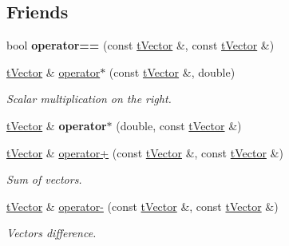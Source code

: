 \subsection*{Friends}
\begin{DoxyCompactItemize}
\item 
\mbox{\label{classtVector_ac2deba186e1ddd047a218201d4cf1c6f}} 
bool {\bfseries operator==} (const \hyperlink{classtVector}{t\+Vector} \&, const \hyperlink{classtVector}{t\+Vector} \&)
\item 
\mbox{\label{classtVector_ade0381c9b2e5496022391703599e1cfe}} 
\hyperlink{classtVector}{t\+Vector} \& \hyperlink{classtVector_ade0381c9b2e5496022391703599e1cfe}{operator$\ast$} (const \hyperlink{classtVector}{t\+Vector} \&, double)
\begin{DoxyCompactList}\small\item\em Scalar multiplication on the right. \end{DoxyCompactList}\item 
\mbox{\label{classtVector_a64a031b3695b984a50c362f8127f5bea}} 
\hyperlink{classtVector}{t\+Vector} \& {\bfseries operator$\ast$} (double, const \hyperlink{classtVector}{t\+Vector} \&)
\item 
\mbox{\label{classtVector_a9915bc8041ae050a433e85aea90f5471}} 
\hyperlink{classtVector}{t\+Vector} \& \hyperlink{classtVector_a9915bc8041ae050a433e85aea90f5471}{operator+} (const \hyperlink{classtVector}{t\+Vector} \&, const \hyperlink{classtVector}{t\+Vector} \&)
\begin{DoxyCompactList}\small\item\em Sum of vectors. \end{DoxyCompactList}\item 
\mbox{\label{classtVector_ab805cb8e1108272d31808bf4d258ba15}} 
\hyperlink{classtVector}{t\+Vector} \& \hyperlink{classtVector_ab805cb8e1108272d31808bf4d258ba15}{operator-\/} (const \hyperlink{classtVector}{t\+Vector} \&, const \hyperlink{classtVector}{t\+Vector} \&)
\begin{DoxyCompactList}\small\item\em Vectors difference. \end{DoxyCompactList}\item 
\mbox{\label{classtVector_abec310e2c4d30878d11d0b2f5d02cad4}} 

\end{DoxyCompactItemize}
